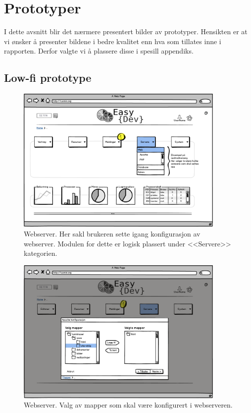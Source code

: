 \chapter{Prototyper}
I dette avsnitt blir det nærmere presentert bilder av prototyper. Hensikten er at vi ønsker å presenter bildene i bedre kvalitet enn hva som tillates inne i rapporten. Derfor valgte vi å plassere disse i spesill appendiks.
\section{Low-fi prototype} \label{sec:appendiksLowFi}
\newcommand{\lowB}{0.9}
\begin{figure}[ht]
\centering
\includegraphics[width=\lowB\textwidth,height=\textheight,keepaspectratio]
{./img/prosessdokumentasjon/lowfi/apache1.png}
\caption[Low-fi Webserver 1]{Webserver. Her sakl brukeren sette igang konfigurasjon av webserver. Modulen for dette er logisk plassert under <<Servere>> kategorien.}
\label{fig:apachelow1}
\end{figure}

\begin{figure}[ht]
\centering
\includegraphics[width=\lowB\textwidth,height=\textheight,keepaspectratio]{./img/prosessdokumentasjon/lowfi/apache2.png}
\caption[Low-fi Webserver 2]{Webserver. Valg av mapper som skal være konfigurert i webserveren.}
\label{fig:apachelow2}
\end{figure}

